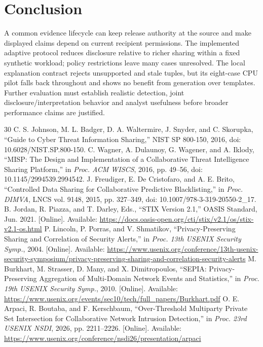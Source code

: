 \documentclass[conference,letterpaper]{IEEEtran}
\begin{document}
\section{Conclusion}
A common evidence lifecycle can keep release authority at the source and make displayed claims depend on current recipient permissions. The implemented adaptive protocol reduces disclosure relative to richer sharing within a fixed synthetic workload; policy restrictions leave many cases unresolved. The local explanation contract rejects unsupported and stale tuples, but its eight-case CPU pilot falls back throughout and shows no benefit from generation over templates. Further evaluation must establish realistic detection, joint disclosure/interpretation behavior and analyst usefulness before broader performance claims are justified.

\begin{thebibliography}{30}
 C. S. Johnson, M. L. Badger, D. A. Waltermire, J. Snyder, and C. Skorupka, ``Guide to Cyber Threat Information Sharing,'' NIST SP 800-150, 2016, doi: 10.6028/NIST.SP.800-150.
 C. Wagner, A. Dulaunoy, G. Wagener, and A. Iklody, ``MISP: The Design and Implementation of a Collaborative Threat Intelligence Sharing Platform,'' in \emph{Proc. ACM WISCS}, 2016, pp. 49--56, doi: 10.1145/2994539.2994542.
 J. Freudiger, E. De Cristofaro, and A. E. Brito, ``Controlled Data Sharing for Collaborative Predictive Blacklisting,'' in \emph{Proc. DIMVA}, LNCS vol. 9148, 2015, pp. 327--349, doi: 10.1007/978-3-319-20550-2\_17.
 B. Jordan, R. Piazza, and T. Darley, Eds., ``STIX Version 2.1,'' OASIS Standard, Jun. 2021. [Online]. Available: \url{https://docs.oasis-open.org/cti/stix/v2.1/os/stix-v2.1-os.html}
 P. Lincoln, P. Porras, and V. Shmatikov, ``Privacy-Preserving Sharing and Correlation of Security Alerts,'' in \emph{Proc. 13th USENIX Security Symp.}, 2004. [Online]. Available: \url{https://www.usenix.org/conference/13th-usenix-security-symposium/privacy-preserving-sharing-and-correlation-security-alerts}
 M. Burkhart, M. Strasser, D. Many, and X. Dimitropoulos, ``SEPIA: Privacy-Preserving Aggregation of Multi-Domain Network Events and Statistics,'' in \emph{Proc. 19th USENIX Security Symp.}, 2010. [Online]. Available: \url{https://www.usenix.org/events/sec10/tech/full_papers/Burkhart.pdf}
 O. E. Arpaci, R. Boutaba, and F. Kerschbaum, ``Over-Threshold Multiparty Private Set Intersection for Collaborative Network Intrusion Detection,'' in \emph{Proc. 23rd USENIX NSDI}, 2026, pp. 2211--2226. [Online]. Available: \url{https://www.usenix.org/conference/nsdi26/presentation/arpaci}

\end{thebibliography}
\end{document}
